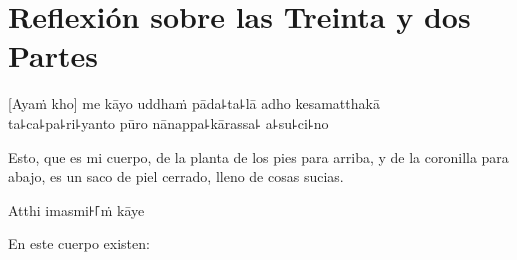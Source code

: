 \chapter[Treinta y dos Partes]{Reflexión sobre las Treinta y dos Partes}


\begin{leader}
\end{leader}

[Ayaṁ kho] me kāyo uddhaṁ pāda꜕ta꜕lā adho kesamatthakā\\
ta꜕ca꜕pa꜕ri꜕yanto pūro nānappa꜕kārassa꜕ a꜕su꜕ci꜕no

\begin{english}
  Esto, que es mi cuerpo, de la planta de los pies para arriba, y de la coronilla para abajo, es un saco de piel cerrado, lleno de cosas sucias.
\end{english}

Atthi imasmi꜔꜒ṁ kāye

\begin{english}
  En este cuerpo existen:
\end{english}

